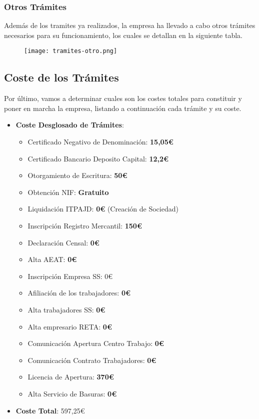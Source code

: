 \subsubsection*{Otros Trámites}
Además de los tramites ya realizados, la empresa ha llevado a cabo otros trámites necesarios para su funcionamiento, los cuales se detallan
en la siguiente tabla.

\begin{figure}[H]
    \centering
    \texttt{[image: tramites-otro.png]}
\end{figure}


\subsection{Coste de los Trámites}
\label{sec:costetramites}
Por último, vamos a determinar cuales son los costes totales para constituir y poner en marcha la empresa, listando a continuación cada trámite y su coste.

\begin{itemize}
    \item \textbf{Coste Desglosado de Trámites}:
    \begin{itemize}
        \item Certificado Negativo de Denominación: \textbf{15,05€}
        \item Certificado Bancario Deposito Capital: \textbf{12,2€}
        \item Otorgamiento de Escritura: \textbf{50€}
        \item Obtención NIF: \textbf{Gratuito}
        \item Liquidación ITPAJD: \textbf{0€} (Creación de Sociedad)
        \item Inscripción Registro Mercantil: \textbf{150€}
        \item Declaración Censal: \textbf{0€}
        \item Alta AEAT: \textbf{0€}
        \item Inscripción Empresa SS: {0€}
        \item Afiliación de los trabajadores: \textbf{0€}
        \item Alta trabajadores SS: \textbf{0€}
        \item Alta empresario RETA: \textbf{0€}
        \item Comunicación Apertura Centro Trabajo: \textbf{0€}
        \item Comunicación Contrato Trabajadores: \textbf{0€}
        \item Licencia de Apertura: \textbf{370€}
        \item Alta Servicio de Basuras: \textbf{0€}
    \end{itemize}

    \item \textbf{Coste Total}: 597,25€
\end{itemize}

